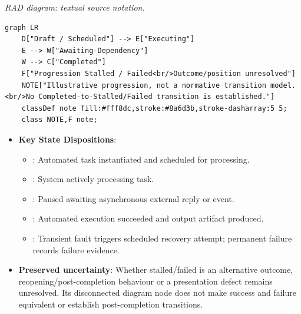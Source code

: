 \textit{RAD diagram: textual source notation.}
\begin{Verbatim}[breaklines,fontsize=\footnotesize]
graph LR
    D["Draft / Scheduled"] --> E["Executing"]
    E --> W["Awaiting-Dependency"]
    W --> C["Completed"]
    F["Progression Stalled / Failed<br/>Outcome/position unresolved"]
    NOTE["Illustrative progression, not a normative transition model.<br/>No Completed-to-Stalled/Failed transition is established."]
    classDef note fill:#fff8dc,stroke:#8a6d3b,stroke-dasharray:5 5;
    class NOTE,F note;
\end{Verbatim}
\label{rad:processes:337}

\begin{itemize}

\item 
\textbf{Key State Dispositions}:


\begin{itemize}

\item 
\texttt{}: Automated task instantiated and scheduled for processing.



\item 
\texttt{}: System actively processing task.



\item 
\texttt{}: Paused awaiting asynchronous external reply or event.



\item 
\texttt{}: Automated execution succeeded and output artifact produced.



\item 
\texttt{}: Transient fault triggers scheduled recovery attempt; permanent failure records failure evidence.



\end{itemize}


\item 
\textbf{Preserved uncertainty}: Whether stalled/\allowbreak{}failed is an alternative outcome, reopening/\allowbreak{}post-completion behaviour or a presentation defect remains unresolved. Its disconnected diagram node does not make success and failure equivalent or establish post-completion transitions.



\end{itemize}
\label{rad:processes:345}

